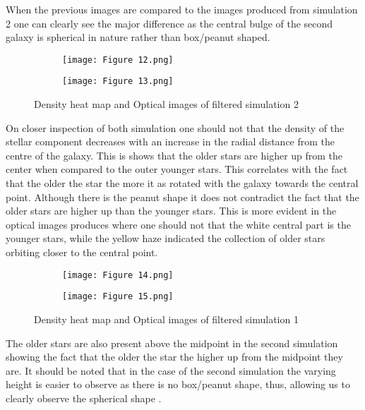 \documentclass[12pt, a4paper]{article}
\begin{document}
When the previous images are compared to the images produced from simulation 2 one can clearly see the major difference as the central bulge of the second galaxy is spherical in nature rather than box/peanut shaped. 

\begin{figure}[H]
  \centering
  \begin{subfigure}{.5\textwidth}
    \centering
    \texttt{[image: Figure 12.png]}
    \label{fig:filter_sphere_heat_map_2}
  \end{subfigure}%
  \begin{subfigure}{.5\textwidth}
    \centering
    \texttt{[image: Figure 13.png]}
    \label{fig:filter_sphere_optical_2}
  \end{subfigure}
  \caption{Density heat map and Optical images of filtered simulation 2}
  \label{fig:filter_sphere_com_2}
\end{figure}

On closer inspection of both simulation one should not that the density of the stellar component decreases with an increase in the radial distance from the centre of the galaxy. This is shows that the older stars are higher up from the center when compared to the outer younger stars. This correlates with the fact that the older the star the more it as rotated with the galaxy towards the central point. Although there is the peanut shape it does not contradict the fact that the older stars are higher up than the younger stars. This is more evident in the optical images produces where one should not that the white central part is the younger stars, while the yellow haze indicated the collection of older stars orbiting closer to the central point. 

\begin{figure}[H]
  \centering
  \begin{subfigure}{.5\textwidth}
    \centering
    \texttt{[image: Figure 14.png]}
    \label{fig:filter_height_heat_map_1}
  \end{subfigure}%
  \begin{subfigure}{.5\textwidth}
    \centering
    \texttt{[image: Figure 15.png]}
    \label{fig:filter_height_optical_1}
  \end{subfigure}
  \caption{Density heat map and Optical images of filtered simulation 1}
  \label{fig:filter_height_com_1}
\end{figure}

The older stars are also present above the midpoint in the second simulation showing the fact that the older the star the higher up from the midpoint they are. It should be noted that in the case of the second simulation the varying height is easier to observe as there is no box/peanut shape, thus, allowing us to clearly observe the spherical shape \parencite{GalacticBulge}. 
\end{document}
